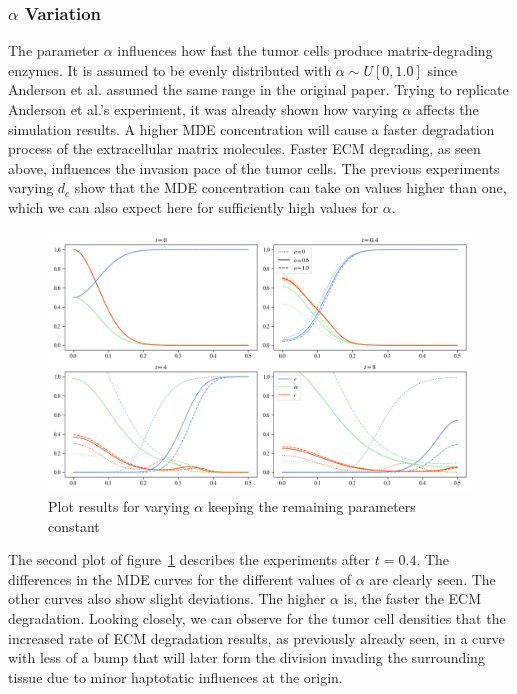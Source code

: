 \subsubsection*{$\alpha$ Variation}
The parameter $\alpha$ influences how fast the tumor cells produce matrix-degrading enzymes. It is assumed to be evenly distributed with $\alpha \sim U[0, 1.0]$ since Anderson et al. assumed the same range in the original paper. Trying to replicate Anderson et al.'s experiment, it was already shown how varying $\alpha$ affects the simulation results. A higher MDE concentration will cause a faster degradation process of the extracellular matrix molecules. Faster ECM degrading, as seen above, influences the invasion pace of the tumor cells. The previous experiments varying $d_c$ show that the MDE concentration can take on values higher than one, which we can also expect here for sufficiently high values for $\alpha$. 
\begin{figure}[h]
 \centering
 \includegraphics[width=\textwidth]{resources/images/alpha_variation.png}
 \caption{Plot results for varying $\alpha$ keeping the remaining parameters constant}
 \label{fig:alpha_variation}
\end{figure}

The second plot of figure~\ref{fig:alpha_variation} describes the experiments after $t=0.4$. The differences in the MDE curves for the different values of $\alpha$ are clearly seen. The other curves also show slight deviations. The higher $\alpha$ is, the faster the ECM degradation. Looking closely, we can observe for the tumor cell densities that the increased rate of ECM degradation results, as previously already seen, in a curve with less of a bump that will later form the division invading the surrounding tissue due to minor haptotatic influences at the origin.

